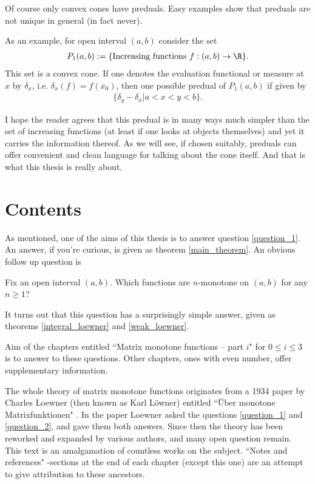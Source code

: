Of course only convex cones have preduals. Easy examples show that preduals are not unique in general (in fact never).

As an example, for open interval $(a, b)$ consider the set
\begin{align*}
	P_{1}(a, b) := \{\text{Increasing functions $f : (a, b) \to \R$}\}.
\end{align*}
This set is a convex cone. If one denotes the evaluation functional or measure at $x$ by $\delta_{x}$, i.e. $\delta_{x}(f) = f(x_{0})$, then one possible predual of $P_{1}(a, b)$ if given by
\begin{align*}
	\{\delta_{y} - \delta_{x} | a < x < y < b \}.
\end{align*}

I hope the reader agrees that this predual is in many ways much simpler than the set of increasing functions (at least if one looks at objects themselves) and yet it carries the information thereof. As we will see, if chosen suitably, preduals can offer convenient and clean language for talking about the cone itself. And that is what this thesis is really about.

\section{Contents}

As mentioned, one of the aims of this thesis is to answer question \ref{question_1}. An answer, if you're curious, is given as theorem \ref{main_theorem}. An obvious follow up question is

\begin{quest}\label{question_2}
	Fix an open interval $(a, b)$. Which functions are $n$-monotone on $(a, b)$ for any $n \geq 1$?
\end{quest}

It turns out that this question has a surprisingly simple answer, given as theorems \ref{integral_loewner} and \ref{weak_loewner}.

Aim of the chapters entitled ``Matrix monotone functions -- part $i$" for $0 \leq i \leq 3$ is to answer to these questions. Other chapters, ones with even number, offer supplementary information.

The whole theory of matrix monotone functions originates from a 1934 paper by Charles Loewner (then known as Karl Löwner) entitled ``Über monotone Matrixfunktionen" \cite{Low}. In the paper Loewner asked the questions \ref{question_1} and \ref{question_2}, and gave them both answers. Since then the theory has been reworked and expanded by various authors, and many open question remain. This text is an amalgamation of countless works on the subject. ``Notes and references" -sections at the end of each chapter (except this one) are an attempt to give attribution to these ancestors.

